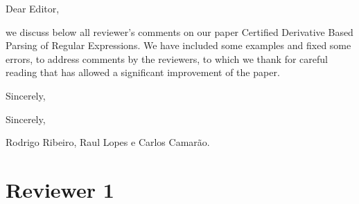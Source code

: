 \documentclass{article}
\date{Ouro Preto, \today}
\begin{document}
\noindent
Dear Editor,

\vspace{1cm}

we discuss below all reviewer's comments on our paper Certified
Derivative Based Parsing of Regular Expressions. We have included some
examples and fixed some errors, to address comments by the reviewers,
to which we thank for careful reading that has allowed a significant
improvement of the paper.

Sincerely,

\vspace{1cm}

\noindent
Sincerely,


\vspace{1cm}

\noindent
Rodrigo Ribeiro, Raul Lopes e Carlos Camar\~ao.

\vspace{1cm}



\section*{Reviewer 1}
\end{document}
